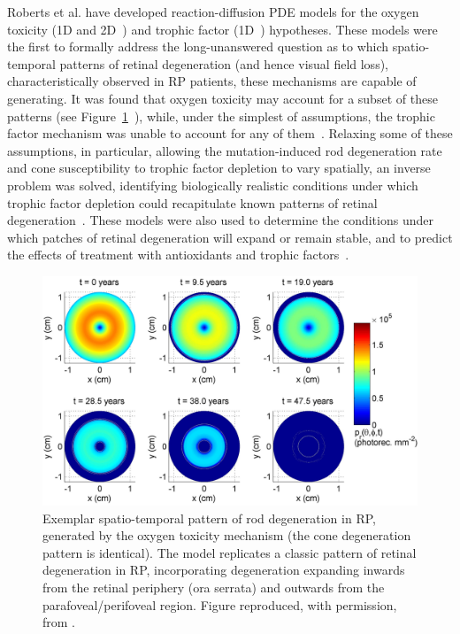 \documentclass{article}
\begin{document}
Roberts et al. have developed reaction-diffusion PDE models for the oxygen toxicity (1D and 2D~\cite{Roberts_et_al_2017,Roberts_et_al_2018a}) and trophic factor (1D~\cite{Roberts_2022a,Roberts_2022b}) hypotheses.
These models were the first to formally address the long-unanswered question as to which spatio-temporal patterns of retinal degeneration (and hence visual field loss), characteristically observed in RP patients, these mechanisms are capable of generating.
It was found that oxygen toxicity may account for a subset of these patterns (see Figure~\ref{Fig_Roberts2018}~\cite{Roberts_et_al_2017,Roberts_et_al_2018a}), while, under the simplest of assumptions, the trophic factor mechanism was unable to account for any of them~\cite{Roberts_2022a}.
Relaxing some of these assumptions, in particular, allowing the mutation-induced rod degeneration rate and cone susceptibility to trophic factor depletion to vary spatially, an inverse problem was solved, identifying biologically realistic conditions under which trophic factor depletion could recapitulate known patterns of retinal degeneration~\cite{Roberts_2022b}.
These models were also used to determine the conditions under which patches of retinal degeneration will expand or remain stable, and to predict the effects of treatment with antioxidants and trophic factors~\cite{Roberts_2022a,Roberts_et_al_2017,Roberts_et_al_2018a}.
%
\begin{figure}
\begin{center}
\includegraphics[scale=0.24]{Roberts_et_al_2018_Fig_5_a}
\end{center}
\caption{Exemplar spatio-temporal pattern of rod degeneration in RP, generated by the oxygen toxicity mechanism (the cone degeneration pattern is identical). The model replicates a classic pattern of retinal degeneration in RP, incorporating degeneration expanding inwards from the retinal periphery (ora serrata) and outwards from the parafoveal/perifoveal region. Figure reproduced, with permission, from \citet{Roberts_et_al_2018a}.}
\label{Fig_Roberts2018}
\end{figure}
\end{document}

